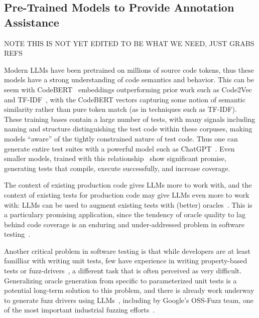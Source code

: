 
\subsection{Pre-Trained Models to Provide Annotation Assistance}

NOTE THIS IS NOT YET EDITED TO BE WHAT WE NEED, JUST GRABS REFS

Modern LLMs have been pretrained on millions of source code tokens, thus these models have a strong understanding of code semantics 
and behavior. This can be seem with CodeBERT~\cite{codebert} embeddings outperforming prior work such as Code2Vec~\cite{code2vec} 
and TF-IDF~\cite{tfidf}, with the CodeBERT vectors capturing some
notion of semantic similarity rather than pure token match (as in techniques 
such as TF-IDF).  These training bases contain a large number of
tests, with many signals including naming and structure distinguishing
the test code within these corpuses, making
models ``aware'' of the tightly constrained nature of test code.
Thus one can generate entire test suites with a powerful model such as ChatGPT~\cite{gpttestgen, siddiq2023empirical}. 
Even smaller models, trained with this relationship~\cite{catlm, starcoder} show significant promise, generating tests that compile, execute successfully, and 
increase coverage.

The context of existing production code gives LLMs more to work with,
and the context of existing tests for production code may give LLMs
even more to work with: LLMs can be used to augment existing tests
with (better) oracles~\cite{OracleGEN}.  This is a particulary promising
application, since the tendency of oracle quality to lag behind code coverage
is an enduring and under-addressed problem in software testing~\cite{MindGap}.

Another critical problem in software testing is that while developers are
at least familliar with writing unit tests, few have experience in
writing property-based tests or fuzz-drivers~\cite{goldstein2022some}, a different task
that is often perceived as very difficult.  Generalizing oracle
generation from specific to parameterized unit tests is a potential
long-term solution to this problem, and there is already work underway
to generate fuzz drivers using LLMs~\cite{zhang2023understanding},
including by Google's OSS-Fuzz team, one of the most important
industrial fuzzing efforts~\cite{ossfuzzllm}.

